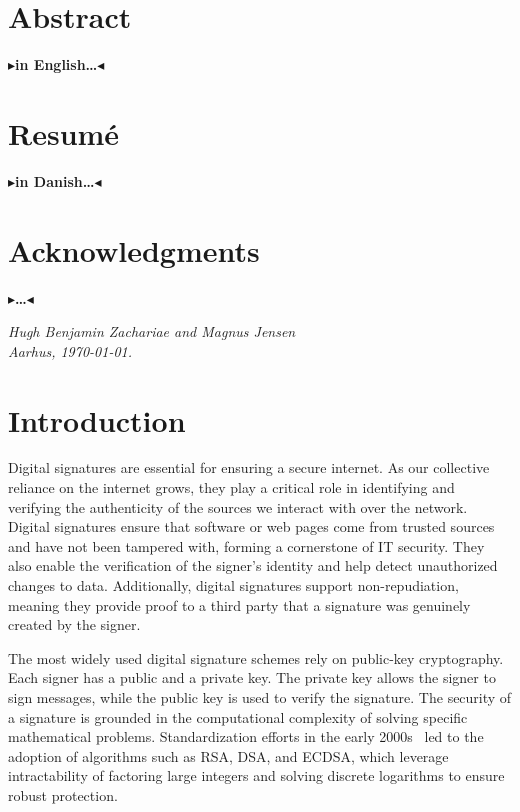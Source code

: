 \documentclass[11pt]{report}
\theoremstyle{definition}
\theoremstyle{plain}
\newcommand{\todo}[1]{{\color[rgb]{.5,0,0}\textbf{$\blacktriangleright$#1$\blacktriangleleft$}}}
\begin{document}
\pagestyle{plain}
\chapter*{Abstract}

\todo{in English\dots}

\chapter*{Resum\'e}

\todo{in Danish\dots}

\chapter*{Acknowledgments}

\todo{\dots}

\vspace{2ex}
\begin{flushright}
  \emph{Hugh Benjamin Zachariae and Magnus Jensen}\\
  \emph{Aarhus, \today.}
\end{flushright}

\tableofcontents
\cleardoublepage
{}
\setcounter{secnumdepth}{3}


\chapter{Introduction}\label{ch:intro}

Digital signatures are essential for ensuring a secure internet. As our collective reliance on the internet grows, they play a critical role in identifying and verifying the authenticity of the sources we interact with over the network. Digital signatures ensure that software or web pages come from trusted sources and have not been tampered with, forming a cornerstone of IT security. They also enable the verification of the signer's identity and help detect unauthorized changes to data. Additionally, digital signatures support non-repudiation, meaning they provide proof to a third party that a signature was genuinely created by the signer.

The most widely used digital signature schemes rely on public-key cryptography. Each signer has a public and a private key. The private key allows the signer to sign messages, while the public key is used to verify the signature. The security of a signature is grounded in the computational complexity of solving specific mathematical problems. Standardization efforts in the early 2000s~\cite{pub2000digital} led to the adoption of algorithms such as RSA, DSA, and ECDSA, which leverage intractability of factoring large integers and solving discrete logarithms to ensure robust protection.
\end{document}
